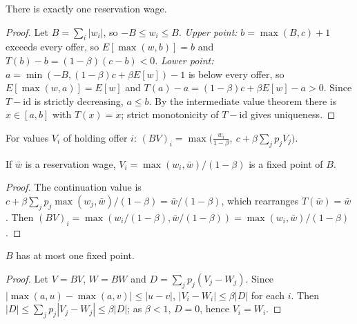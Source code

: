 \begin{theorem}
\label{thm:mccall_existsUnique}
\leanok
{}
There is exactly one reservation wage.
\end{theorem}
\begin{proof}
\leanok
Let $B = \sum_i |w_i|$, so $-B \le w_i \le B$. \emph{Upper point:} $b = \max(B, c) + 1$ exceeds every offer, so
$E[\max(w, b)] = b$ and $T(b) - b = (1-\beta)(c - b) < 0$. \emph{Lower point:}
$a = \min(-B, (1-\beta)c + \beta E[w]) - 1$ is below every offer, so $E[\max(w, a)] = E[w]$ and
$T(a) - a = (1-\beta)c + \beta E[w] - a > 0$. Since $T - \mathrm{id}$ is strictly decreasing, $a \le b$. By the
intermediate value theorem there is $x \in [a, b]$ with $T(x) = x$; strict monotonicity of $T - \mathrm{id}$
gives uniqueness.
\end{proof}

\begin{definition}
\label{def:mccall_bellman}
\leanok
{}
For values $V_i$ of holding offer $i$: $(BV)_i = \max\big(\frac{w_i}{1-\beta},\ c + \beta\sum_j p_j V_j\big)$.
\end{definition}

\begin{theorem}
\label{thm:mccall_bellman_solution}
\leanok
{}
If $\bar w$ is a reservation wage, $V_i = \max(w_i, \bar w)/(1-\beta)$ is a fixed point of $B$.
\end{theorem}
\begin{proof}
\leanok
The continuation value is $c + \beta\sum_j p_j \max(w_j, \bar w)/(1-\beta) = \bar w/(1-\beta)$, which rearranges
$T(\bar w) = \bar w$. Then $(BV)_i = \max(w_i/(1-\beta), \bar w/(1-\beta)) = \max(w_i, \bar w)/(1-\beta)$.
\end{proof}

\begin{theorem}
\label{thm:mccall_bellman_unique}
\leanok
{}
$B$ has at most one fixed point.
\end{theorem}
\begin{proof}
\leanok
Let $V = BV$, $W = BW$ and $D = \sum_j p_j(V_j - W_j)$. Since $|\max(a, u) - \max(a, v)| \le |u - v|$,
$|V_i - W_i| \le \beta|D|$ for each $i$. Then $|D| \le \sum_j p_j |V_j - W_j| \le \beta|D|$; as $\beta < 1$,
$D = 0$, hence $V_i = W_i$.
\end{proof}


